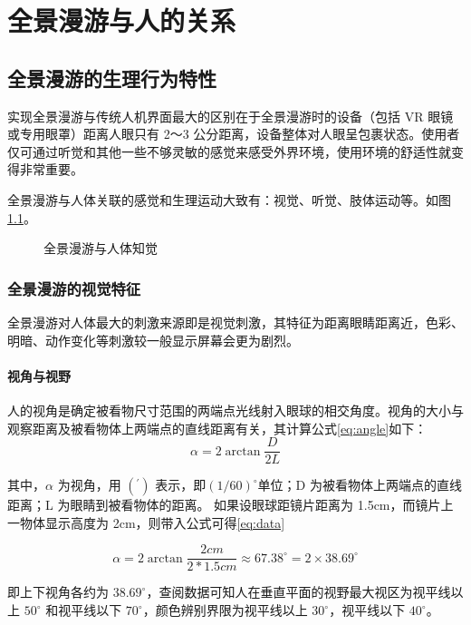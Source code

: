 \chapter{全景漫游与人的关系}

\section{全景漫游的生理行为特性}
实现全景漫游与传统人机界面最大的区别在于全景漫游时的设备（包括 VR 眼镜或专用眼罩）距离人眼只有 2～3 公分距离，设备整体对人眼呈包裹状态。使用者仅可通过听觉和其他一些不够灵敏的感觉来感受外界环境，使用环境的舒适性就变得非常重要。

全景漫游与人体关联的感觉和生理运动大致有：视觉、听觉、肢体运动等。如图\ref{fig:human_sence}。

\begin{figure}[htp]
\centering
{}
\caption{全景漫游与人体知觉}
\label{fig:human_sence}
\end{figure}

\subsection{全景漫游的视觉特征}
全景漫游对人体最大的刺激来源即是视觉刺激，其特征为距离眼睛距离近，色彩、明暗、动作变化等刺激较一般显示屏幕会更为剧烈。

\subsubsection{视角与视野}

人的视角是确定被看物尺寸范围的两端点光线射入眼球的相交角度。视角的大小与观察距离及被看物体上两端点的直线距离有关，其计算公式\ref{eq:angle}如下：
\begin{equation}
\alpha=2\arctan{\frac{D}{2L}}
\label{eq:angle}
\end{equation}

其中，$\alpha$ 为视角，用 $(^{\prime})$ 表示，即$(1/60)^{\circ}$单位；D 为被看物体上两端点的直线距离；L 为眼睛到被看物体的距离。
如果设眼球距镜片距离为 1.5cm，而镜片上一物体显示高度为 2cm，则带入公式可得\ref{eq:data}

\begin{equation}
\alpha=2\arctan{\frac{2cm}{2*1.5cm}}\approx 67.38 ^{\circ} = 2 \times 38.69^{\circ}
\label{eq:data}
\end{equation}

即上下视角各约为 $38.69^{\circ}$，查阅数据可知人在垂直平面的视野最大视区为视平线以上 $50^{\circ}$ 和视平线以下 $70^{\circ}$，颜色辨别界限为视平线以上 $30^{\circ}$，视平线以下 $40^{\circ}$。

